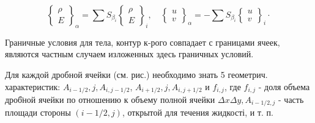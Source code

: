 \documentclass[10pt]{article}
\begin{document}
\[

\left\{\begin{array}{c}

\rho \\

E

\end{array}\right\}_{\alpha}=\sum S_{\beta_{i}}\left\{\begin{array}{c}

\rho \\

E

\end{array}\right\}_{i}, \quad\left\{\begin{array}{l}

u \\

v

\end{array}\right\}_{\alpha}=-\sum S_{\beta_{i}}\left\{\begin{array}{l}

u \\

v

\end{array}\right\}_{i} \cdot

\]



Граничные условия для тела, контур к-рого совпадает с границами ячеек, являются частным случаем изложенных здесь граничных условий.



Для каждой дробной ячейки (см. рис.) необходимо знать 5 геометрич. характеристик: $A_{i-1 / 2}, j, A_{i, j-1 / 2}$, $A_{i+1 / 2}, j, A_{i, j+1 / 2}$ и $f_{i, j}$, где $f_{i, j}$ - доля объема дроб̈ной ячейки по отношению к объему полной ячейки $\Delta x \Delta y, A_{i-1 / 2, j}$ - часть площади стороны $(i-1 / 2, j)$, открытой для течения жидкості, и т. п.
\end{document}

